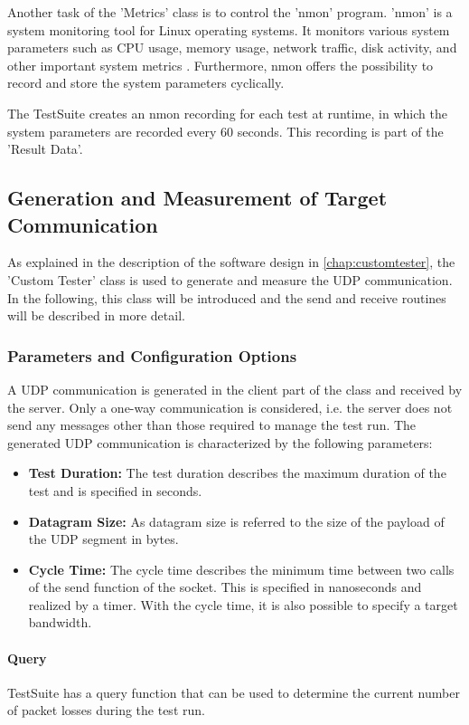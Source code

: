 Another task of the 'Metrics' class is to control the 'nmon' program. 'nmon' is a system monitoring tool for Linux operating systems. It monitors various system parameters such as CPU usage, memory usage, network traffic, disk activity, and other important system metrics \cite{tsd04}. Furthermore, nmon offers the possibility to record and store the system parameters cyclically.

The TestSuite creates an nmon recording for each test at runtime, in which the system parameters are recorded every 60 seconds. This recording is part of the 'Result Data'.

\subsection{Generation and Measurement of Target Communication} \label{chap:targetcom}
As explained in the description of the software design in \ref{chap:customtester}, the 'Custom Tester' class is used to generate and measure the UDP communication.  In the following, this class will be introduced and the send and receive routines will be described in more detail.

\subsubsection{Parameters and Configuration Options}
A UDP communication is generated in the client part of the class and received by the server. Only a one-way communication is considered, i.e. the server does not send any messages other than those required to manage the test run. The generated UDP communication is characterized by the following parameters:

\begin{itemize}
	\item \textbf{Test Duration:} The test duration describes the maximum duration of the test and is specified in seconds.
	\item \textbf{Datagram Size:} As datagram size is referred to the size of the payload of the UDP segment in bytes.
	\item \textbf{Cycle Time:} The cycle time describes the minimum time between two calls of the send function of the socket. This is specified in nanoseconds and realized by a timer. With the cycle time, it is also possible to specify a target bandwidth.
\end{itemize}

\paragraph{Query} \label{chap:targetcom:query}
TestSuite has a query function that can be used to determine the current number of packet losses during the test run.

